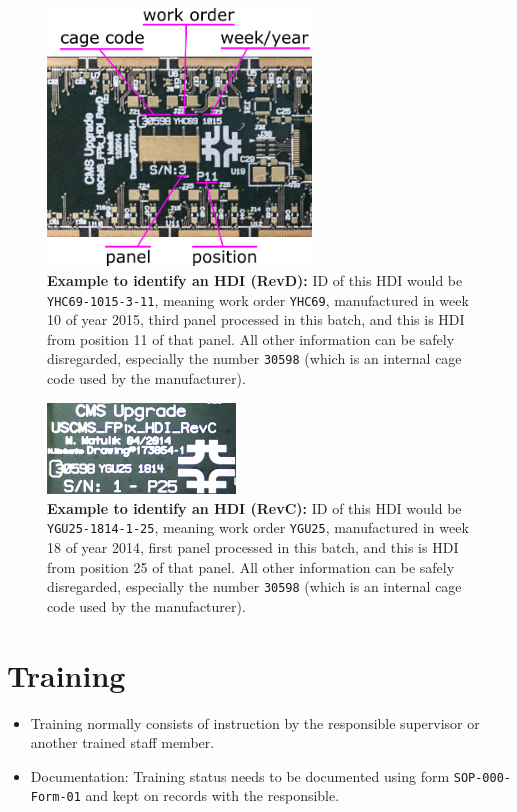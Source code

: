 \documentclass[12pt]{unlsilabsop}
\begin{document}
\begin{figure}[hH]
    \begin{center}
        \includegraphics[width=7cm]{img/HDIRevD_id.png}
        \caption{\textbf{Example to identify an HDI (RevD):} ID of this HDI would be \texttt{YHC69-1015-3-11}, meaning work order \texttt{YHC69}, manufactured in week 10 of year 2015, third panel processed in this batch, and this is HDI from position 11 of that panel. All other information can be safely disregarded, especially the number \texttt{30598} (which is an internal cage code used by the manufacturer).}
        \label{fig:HDI_SN_RevD}
    \end{center}
\end{figure}

\begin{figure}[hH]
    \begin{center}
        \includegraphics[width=5cm]{img/HDI_SN.jpg}
        \caption{\textbf{Example to identify an HDI (RevC):} ID of this HDI would be \texttt{YGU25-1814-1-25}, meaning work order \texttt{YGU25}, manufactured in week 18 of year 2014, first panel processed in this batch, and this is HDI from position 25 of that panel. All other information can be safely disregarded, especially the number \texttt{30598} (which is an internal cage code used by the manufacturer).}
        \label{fig:HDI_SN_RevC}
    \end{center}
\end{figure}

\section{Training}
\begin{itemize}
\item Training normally consists of instruction by the responsible supervisor or another trained staff member.
\item Documentation: Training status needs to be documented using form \texttt{SOP-000-Form-01} and kept on records with the responsible.
\end{itemize}
\end{document}
